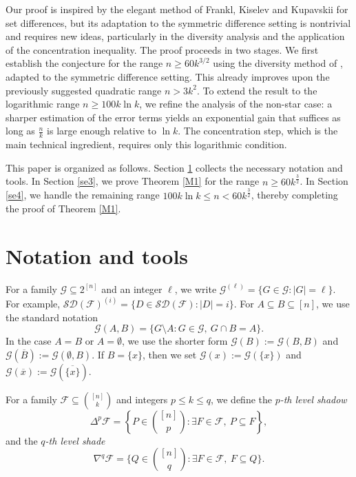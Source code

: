 \documentclass[11pt]{article}
\numberwithin{equation}{section}
\begin{document}
 Our proof is inspired by the elegant method of Frankl, Kiselev and Kupavskii \cite{F23} for set differences, but its adaptation to the symmetric difference setting is nontrivial and requires new ideas, particularly in the diversity analysis and the application of the concentration inequality. 
The proof proceeds in two stages. We first establish the conjecture for the range $n \geq 60k^{3/2}$ using the diversity method of   \cite{F23}, adapted to the symmetric difference setting. This already improves upon the previously suggested quadratic range $n > 3k^2$. To extend the result to the logarithmic range $n \geq 100k \ln k$, we refine the analysis of the non-star case: a sharper estimation of the error terms yields an exponential gain that suffices as long as $\frac{n}{k}$ is large enough relative to  $\ln k$. The concentration step, which is the main technical ingredient, requires only this logarithmic condition.





This paper is organized as follows. Section \ref{se2} collects the necessary notation and tools. In Section \ref{se3}, we  prove Theorem \ref{M1} for the range  $n\ge 60k^\frac{3}{2}$. In Section \ref{se4}, we handle the remaining  range $100 k\ln k \le n< 60k^\frac{3}{2}$, thereby completing the proof of Theorem \ref{M1}. 



\section{Notation and tools} \label{se2}

For a family $\mathcal{G} \subseteq 2^{[n]}$ and an integer $\ell$, we write $\mathcal{G}^{(\ell)} = \{G \in \mathcal{G} : |G| = \ell\}$. 
For example,
$
\mathcal{SD}(\mathcal{F})^{(i)}= \{ D \in \mathcal{SD}(\mathcal{F}) : |D| = i \}.
$
For $A\subseteq B\subseteq [n]$, we use the standard notation $$\mathcal{G}(A,B)=\{G\setminus A:G\in \mathcal{G},\: G\cap B=A\}.$$
In the case $A=B$ or $A=\emptyset$, we use the shorter form $\mathcal{G}(B):=\mathcal{G}(B,B)$ and $\mathcal{G}(\overline{B}):=\mathcal{G}(\emptyset,B)$.
If $B=\{x\}$, then we set $\mathcal{G}(x):=\mathcal{G}(\{x\})$ and $\mathcal{G}(\overline{x}):=\mathcal{G}(\overline{\{x\}})$.


For a family $\mathcal{F} \subseteq \binom{[n]}{k}$ and  integers $p \le k \leq q$, we define the \textit{$p$-th level shadow} 
$$
\Delta^p \mathcal{F} = \left\{ P \in \binom{[n]}{p} : \exists F \in \mathcal{F}, \ P \subseteq F \right\},
$$
and the \textit{$q$-th level shade} 
$$\nabla^q\mathcal{F}=\{Q\in\binom{[n]}{q} :\exists F \in \mathcal{F}, \ F\subseteq Q\}.$$
\end{document}
